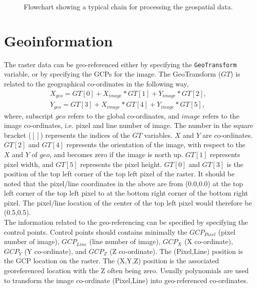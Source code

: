 \documentclass[10pt]{book}
\begin{document}
{\begin{figure}[h]
\begin{center}
  \caption{Flowchart showing a typical chain for processing the geospatial data.}
  \label{fig:flowchart_geo}
 \end{center}
\end{figure}

\section{Geoinformation}
The raster data can be geo-referenced  either by specifying the \verb"GeoTransform" variable, or by specifying the GCPs for the image. The GeoTransform ($GT$) is related to the geographical co-ordinates in the following way,
\begin{eqnarray}
X_{geo} = GT[0] + X_{image}*GT[1] + Y_{image}*GT[2], \\
Y_{geo} = GT[3] + X_{image}*GT[4] + Y_{image}*GT[5],
\end{eqnarray}
where, subscript $geo$ refers to the global co-ordinates, and $image$ refers to the image co-ordinates, i.e. pixel and line number of image. The number in the square bracket ($[]$) represents the indices of the $GT$ variables. $X$ and $Y$ are co-ordinates. $GT[2]$ and $GT[4]$ represents the orientation of the image, with respect to the $X$ and $Y$ of $geo$, and becomes zero if the image is north up. $GT[1]$ represents pixel width, and $GT[5]$ represents the pixel height. $GT[0]$ and $GT[3]$ is the position of the  top left corner of the top left pixel of the raster. It should be noted that the pixel/line coordinates in the above are from (0.0,0.0) at the top left corner of the top left pixel to at the bottom right corner of the bottom right pixel. The pixel/line location of the center of the top left pixel would therefore be (0.5,0.5).\\

The information related to the geo-referencing can be specified by specifying the control points. Control points should contains minimally the $GCP_{Pixel}$ (pixel number of image), $GCP_{Line}$ (line number of image), $GCP_X$ (X co-ordinate), $GCP_Y$ (Y co-ordinate), and $GCP_Z$ (Z co-ordinate). The (Pixel,Line) position is the GCP location on the raster. The (X,Y,Z) position is the associated georeferenced location with the Z often being zero. Usually polynomials are used to transform the image co-ordinate (Pixel,Line) into geo-referenced co-ordinates. \\

}
\end{document}
